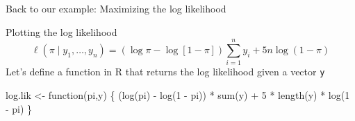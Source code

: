 \documentclass{beamer}
\begin{document}
\begin{frame}{Back to our example: Maximizing the log likelihood}
\begin{center}
\end{center}
\end{frame}

\begin{frame}[fragile]{Plotting the log likelihood}
$$\ell(\pi\mid y_1,\dots,y_n) = (\log \pi - \log[1-\pi]) \sum_{i=1}^n y_i + 5n\log(1-\pi)$$
Let's define a function in R that returns the log likelihood given a vector \texttt{y} \pause

\begin{scriptsize}
\begin{semiverbatim}
log.lik <- function(pi,y) \{
     (log(pi) - log(1 - pi)) * sum(y) + 5 * length(y) * log(1 - pi)
\}
\end{semiverbatim}
\end{scriptsize}

\end{frame}
\end{document}
